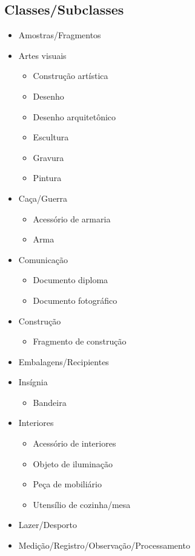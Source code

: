 \subsection{Classes/Subclasses}
\begin{itemize}
	\item Amostras/Fragmentos
	\item Artes visuais
	\begin{itemize}
		\item Construção artística
		\item Desenho
		\item Desenho arquitetônico
		\item Escultura
		\item Gravura
		\item Pintura
	\end{itemize}
	\item Caça/Guerra 
	\begin{itemize}
		\item Acessório de armaria
		\item Arma
	\end{itemize}
    \item Comunicação
    \begin{itemize}
    	\item Documento diploma
    	\item Documento fotográfico
    \end{itemize}
	\item Construção
	\begin{itemize}
		\item Fragmento de construção
	\end{itemize}
	\item Embalagens/Recipientes
	\item Insígnia
	\begin{itemize}
		\item Bandeira
	\end{itemize}
	\item Interiores
	\begin{itemize}
		\item Acessório de interiores
		\item Objeto de iluminação
		\item Peça de mobiliário 
		\item Utensílio de cozinha/mesa
	\end{itemize}
	\item Lazer/Desporto
	\item Medição/Registro/Observação/Processamento

\end{itemize}
